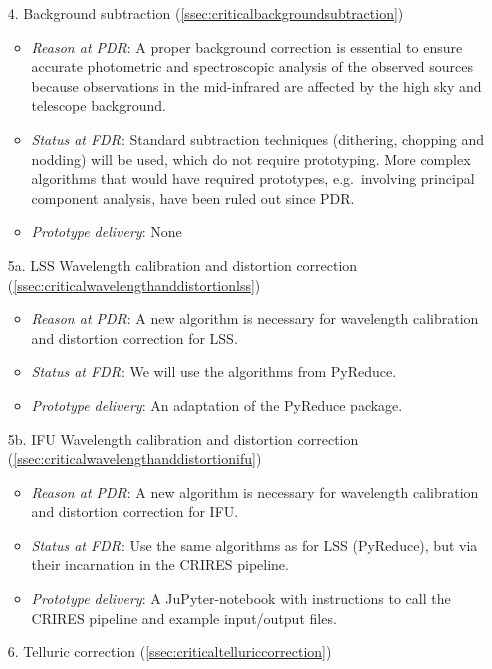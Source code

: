 \begin{enumerate}
    \item[4.] Background subtraction (\ref{ssec:criticalbackgroundsubtraction})
    \begin{itemize}
        \item \textit{Reason at PDR}: A proper background correction is essential to ensure accurate photometric and spectroscopic analysis of the observed sources because observations in the mid-infrared are affected by the high sky and telescope background.
        \item \textit{Status at FDR}: Standard subtraction techniques (dithering, chopping and nodding) will be used, which do not require prototyping. More complex algorithms that would have required prototypes, e.g.~involving principal component analysis, have been ruled out since PDR.
        \item \textit{Prototype delivery}: None
    \end{itemize}
    \item[5a.] LSS Wavelength calibration and distortion correction (\ref{ssec:criticalwavelengthanddistortionlss})
    \begin{itemize}
        \item \textit{Reason at PDR}: A new algorithm is necessary for wavelength calibration and distortion correction for LSS.
        \item \textit{Status at FDR}: We will use the algorithms from PyReduce.
        \item \textit{Prototype delivery}: An adaptation of the PyReduce package.
    \end{itemize}
    \item[5b.] \ac{IFU} Wavelength calibration and distortion correction (\ref{ssec:criticalwavelengthanddistortionifu})
    \begin{itemize}
        \item \textit{Reason at PDR}: A new algorithm is necessary for wavelength calibration and distortion correction for IFU.
        \item \textit{Status at FDR}: Use the same algorithms as for LSS (PyReduce), but via their incarnation in the CRIRES pipeline.
        \item \textit{Prototype delivery}: A JuPyter-notebook with instructions to call the CRIRES pipeline and example input/output files.
    \end{itemize}
    \item[6.] Telluric correction (\ref{ssec:criticaltelluriccorrection})
    \begin{itemize}

\end{itemize}
\end{enumerate}

